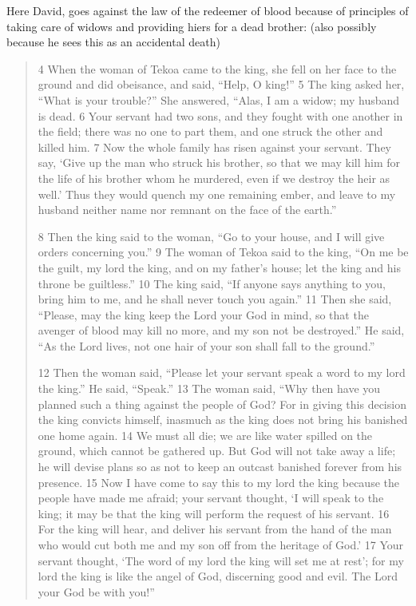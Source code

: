 \documentclass[11pt]{article}
\begin{document}
Here David, goes against the law of the redeemer of blood because of principles of taking care of widows and providing hiers for a dead brother: (also possibly because he sees this as an accidental death)
\begin{quote}
4 When the woman of Tekoa came to the king, she fell on her face to the ground and did obeisance, and said, “Help, O king!” 5 The king asked her, “What is your trouble?” She answered, “Alas, I am a widow; my husband is dead. 6 Your servant had two sons, and they fought with one another in the field; there was no one to part them, and one struck the other and killed him. 7 Now the whole family has risen against your servant. They say, ‘Give up the man who struck his brother, so that we may kill him for the life of his brother whom he murdered, even if we destroy the heir as well.’ Thus they would quench my one remaining ember, and leave to my husband neither name nor remnant on the face of the earth.”

8 Then the king said to the woman, “Go to your house, and I will give orders concerning you.” 9 The woman of Tekoa said to the king, “On me be the guilt, my lord the king, and on my father’s house; let the king and his throne be guiltless.” 10 The king said, “If anyone says anything to you, bring him to me, and he shall never touch you again.” 11 Then she said, “Please, may the king keep the Lord your God in mind, so that the avenger of blood may kill no more, and my son not be destroyed.” He said, “As the Lord lives, not one hair of your son shall fall to the ground.”

12 Then the woman said, “Please let your servant speak a word to my lord the king.” He said, “Speak.” 13 The woman said, “Why then have you planned such a thing against the people of God? For in giving this decision the king convicts himself, inasmuch as the king does not bring his banished one home again. 14 We must all die; we are like water spilled on the ground, which cannot be gathered up. But God will not take away a life; he will devise plans so as not to keep an outcast banished forever from his presence. 15 Now I have come to say this to my lord the king because the people have made me afraid; your servant thought, ‘I will speak to the king; it may be that the king will perform the request of his servant. 16 For the king will hear, and deliver his servant from the hand of the man who would cut both me and my son off from the heritage of God.’ 17 Your servant thought, ‘The word of my lord the king will set me at rest’; for my lord the king is like the angel of God, discerning good and evil. The Lord your God be with you!”


\end{quote}
\end{document}
